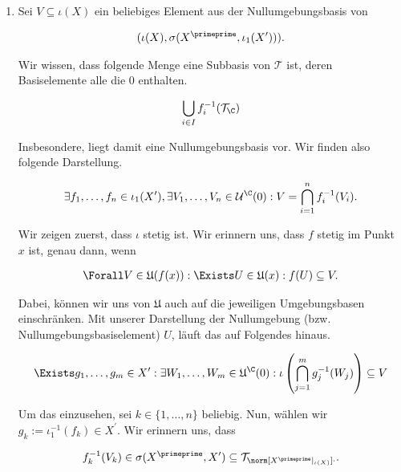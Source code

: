 \begin{solution}

\phantom{}

\begin{enumerate}[label = (\arabic*)]

  \item
  Sei $V \subseteq \iota(X)$ ein beliebiges Element aus der Nullumgebungsbasis von

  \begin{align*}
    (\iota(X),\sigma(X^{\primeprime},\iota_1(X^{\prime}))).
  \end{align*}

  Wir wissen, dass folgende Menge eine Subbasis von $\mathcal{T}$ ist, deren Basiselemente alle die $0$ enthalten.

  \begin{align*}
    \bigcup_{i \in I}f_i^{-1}(\mathcal{T}_{\C})
  \end{align*}

  Insbesondere, liegt damit eine Nullumgebungsbasis vor.
  Wir finden also folgende Darstellung.

  \begin{align*}
    \exists f_1,\dots,f_n \in \iota_1(X^{\prime}), \exists V_1,\dots,V_n \in \mathcal{U}^{\C}(0):
    V = \bigcap_{i=1}^n f_i^{-1}(V_i).
  \end{align*}

  Wir zeigen zuerst, dass $\iota$ stetig ist.
  Wir erinnern uns, dass $f$ stetig im Punkt $x$ ist, genau dann, wenn

  \begin{align*}
    \Forall V \in \mathfrak{U}(f(x)):
    \Exists U \in \mathfrak{U}(x):
    f(U) \subseteq V.
  \end{align*}

  Dabei, können wir uns von $\mathfrak{U}$ auch auf die jeweiligen Umgebungsbasen einschränken.
  Mit unserer Darstellung der Nullumgebung (bzw. Nullumgebungsbasiselement) $U$, läuft das auf Folgendes hinaus.

  \begin{align*}
    \Exists g_1, \dots, g_m \in X^{\prime}:
    \exists W_1, \dots, W_m \in \mathfrak{U}^\C(0):
    \iota\left(\bigcap_{j=1}^m g_j^{-1}(W_j)\right) \subseteq V
  \end{align*}

  Um das einzusehen, sei $k \in \{1,\dots,n\}$ beliebig.
  Nun, wählen wir $g_k := \iota_1^{-1}(f_k) \in X^{\prime}$.
  Wir erinnern uns, dass

  \begin{align*}
    f_k^{-1}(V_k)
    \in
    \sigma(X^{\primeprime}, X^{\prime})
    \subseteq
    \mathcal{T}_{\norm[X^\primeprime|_{\iota(X)}]{\cdot}}.
  \end{align*}


\end{enumerate}
\end{solution}
